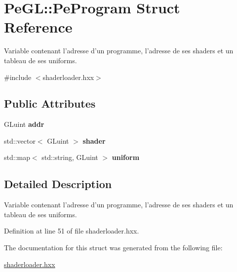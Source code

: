 \hypertarget{structPeGL_1_1PeProgram}{\section{Pe\-G\-L\-:\-:Pe\-Program Struct Reference}
\label{structPeGL_1_1PeProgram}
}


Variable contenant l'adresse d'un programme, l'adresse de ses shaders et un tableau de ses uniforms.  




{\ttfamily \#include $<$shaderloader.\-hxx$>$}

\subsection*{Public Attributes}
\begin{DoxyCompactItemize}
\item 
\hypertarget{structPeGL_1_1PeProgram_a686c8cfcec2d0f85c0a489ca2b03a558}{G\-Luint {\bfseries addr}}\label{structPeGL_1_1PeProgram_a686c8cfcec2d0f85c0a489ca2b03a558}

\item 
\hypertarget{structPeGL_1_1PeProgram_ab2da499cfe130d6dc4f2112ee3030b36}{std\-::vector$<$ G\-Luint $>$ {\bfseries shader}}\label{structPeGL_1_1PeProgram_ab2da499cfe130d6dc4f2112ee3030b36}

\item 
\hypertarget{structPeGL_1_1PeProgram_ac4d1d2053ba3785605056cabb166181e}{std\-::map$<$ std\-::string, G\-Luint $>$ {\bfseries uniform}}\label{structPeGL_1_1PeProgram_ac4d1d2053ba3785605056cabb166181e}

\end{DoxyCompactItemize}


\subsection{Detailed Description}
Variable contenant l'adresse d'un programme, l'adresse de ses shaders et un tableau de ses uniforms. 

Definition at line 51 of file shaderloader.\-hxx.



The documentation for this struct was generated from the following file\-:\begin{DoxyCompactItemize}
\item 
\hyperlink{shaderloader_8hxx}{shaderloader.\-hxx}\end{DoxyCompactItemize}
